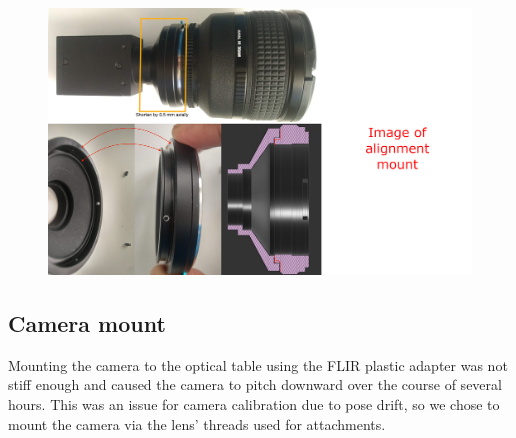 \begin{figure}
    \centering
    \includegraphics[width=\linewidth]{../figures/F-to-C_mount2.png}
    \caption{}
    \label{fig:fotodiox_custom}
\end{figure}

\subsection{Camera mount}
Mounting the camera to the optical table using the FLIR plastic adapter was not stiff enough and caused the camera to pitch downward over the course of several hours. This was an issue for camera calibration due to pose drift, so we chose to mount the camera via the lens' threads used for attachments.

